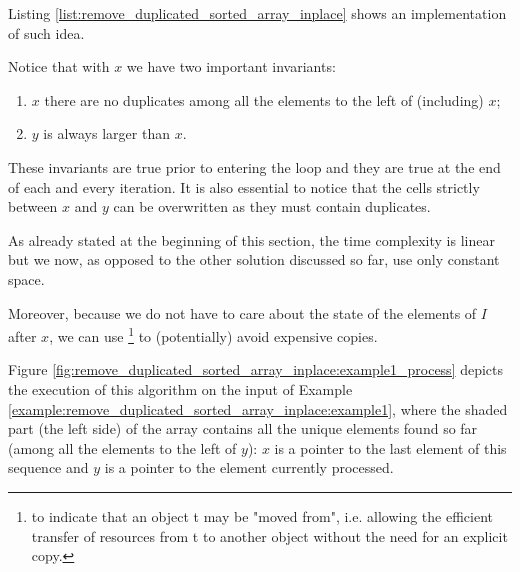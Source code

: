 Listing \ref{list:remove_duplicated_sorted_array_inplace} shows an implementation of such idea.




Notice that with $x$ we have two important invariants:
\begin{enumerate}
	\item $x$ there are no duplicates among all the elements to the left of (including) $x$;
	\item $y$ is always larger than $x$.
\end{enumerate}

These invariants are true prior to entering the  loop and they are true at the end of each and every iteration. It is also essential to notice that the cells strictly between $x$ and $y$ can be overwritten as they must contain duplicates.


As already stated at the beginning of this section, the time complexity is linear but we now, as opposed to the other solution discussed so far, use only constant space. 

Moreover, because we do not have to care about the state of the elements of $I$ after $x$,
we can use \href{https://en.cppreference.com/w/cpp/utility/move}{}\footnote{ to indicate that an object t may be "moved from", i.e. allowing the efficient transfer of resources from t to another object without the need for an explicit copy.} to (potentially) avoid expensive copies.

Figure \ref{fig:remove_duplicated_sorted_array_inplace:example1_process} depicts the execution of this algorithm on the input of Example \ref{example:remove_duplicated_sorted_array_inplace:example1}, where the shaded part (the left side) of the array contains all the unique elements found so far (among all the elements to the left of $y$): $x$ is a pointer to the last element of this sequence and $y$ is a pointer to the element currently processed.


